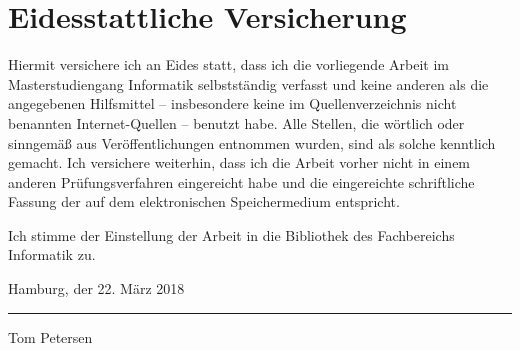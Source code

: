 \documentclass[
    fontsize=12pt,
    headings=small,
    parskip=half,           %
    bibliography=totoc,
    numbers=noenddot,       %
    open=any               %
   ,final                   %
    ]{scrreprt}
\begin{document}













\begin{raggedright}         %
  \printbibliography        %
  \label{sec:literaturverzeichnis}
\end{raggedright}

\newpage
{}

\chapter*{Eidesstattliche Versicherung}

Hiermit  versichere  ich  an  Eides  statt,  dass  ich  die  vorliegende  Arbeit  im 
Masterstudiengang  Informatik  selbstständig  verfasst  und  keine  anderen  als  die 
angegebenen  Hilfsmittel  --  insbesondere  keine  im  Quellenverzeichnis  nicht 
benannten  Internet-Quellen  --  benutzt  habe.  Alle  Stellen,  die  wörtlich  oder 
sinngemäß aus Veröffentlichungen entnommen wurden, sind als solche kenntlich 
gemacht. Ich versichere weiterhin, dass ich die Arbeit vorher nicht in einem anderen 
Prüfungsverfahren eingereicht habe und die eingereichte schriftliche Fassung der 
auf dem elektronischen Speichermedium entspricht.

Ich stimme der Einstellung der Arbeit in die Bibliothek des Fachbereichs Informatik 
zu.

\vspace{1cm}

Hamburg, der 22. März 2018

\vspace{3cm}

\par\noindent\rule{0.3\textwidth}{0.4pt}

Tom Petersen
\end{document}

